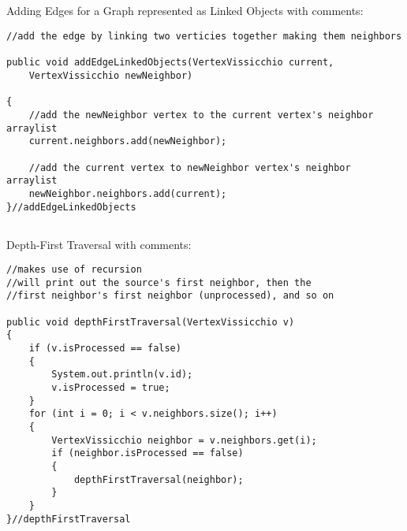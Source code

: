 \documentclass[letterpaper, 10pt]{article}
\begin{document}
\subsection{}
Adding Edges for a Graph represented as Linked Objects with comments: \\
\begin{lstlisting}
//add the edge by linking two verticies together making them neighbors

public void addEdgeLinkedObjects(VertexVissicchio current, 
    VertexVissicchio newNeighbor)
    
{
    //add the newNeighbor vertex to the current vertex's neighbor arraylist
    current.neighbors.add(newNeighbor);
    
    //add the current vertex to newNeighbor vertex's neighbor arraylist
    newNeighbor.neighbors.add(current);
}//addEdgeLinkedObjects
\end{lstlisting}

\subsection{}
Depth-First Traversal with comments:\\
\begin{lstlisting}
//makes use of recursion
//will print out the source's first neighbor, then the 
//first neighbor's first neighbor (unprocessed), and so on

public void depthFirstTraversal(VertexVissicchio v)
{
    if (v.isProcessed == false)
    {
        System.out.println(v.id);
        v.isProcessed = true;
    }
    for (int i = 0; i < v.neighbors.size(); i++)
    {
        VertexVissicchio neighbor = v.neighbors.get(i);
        if (neighbor.isProcessed == false)
        {
            depthFirstTraversal(neighbor);
        }
    }
}//depthFirstTraversal
\end{lstlisting}
\end{document}
